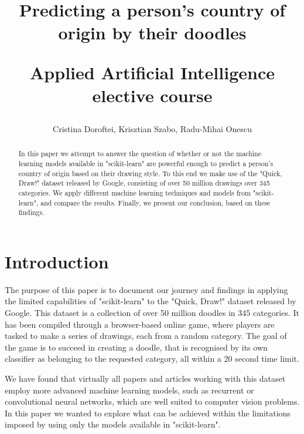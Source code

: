 \documentclass[a4paper, twocolumn]{article}
\author{Cristina Doroftei, Krisztian Szabo, Radu-Mihai Onescu}
\title{Predicting a person's country of origin by their doodles \\
    \begin{large}
        \bigskip
        Applied Artificial Intelligence elective course
    \end{large}
}
\begin{document}
\maketitle
\begin{abstract}
    In this paper we attempt to answer the question of whether or not the machine learning models available in "scikit-learn" are powerful enough to predict a person's country of origin based on their drawing style. To this end we make use of the "Quick, Draw!"\cite{quickdraw} dataset released by Google, consisting of over 50 million drawings over 345 categories. We apply different machine learning techniques and models from "scikit-learn"\cite{scikit-learn}, and compare the results. Finally, we present our conclusion, based on these findings.
\end{abstract}

\section{Introduction\label{sec:Introduction}}
The purpose of this paper is to document our journey and findings in applying the limited capabilities of "scikit-learn" to the "Quick, Draw!" dataset released by Google. This dataset is a collection of over 50 million doodles in 345 categories. It has been compiled through a browser-based online game, where players are tasked to make a series of drawings, each from a random category. The goal of the game is to succeed in creating a doodle, that is recognised by its own classifier as belonging to the requested category, all within a 20 second time limit.

We have found that virtually all papers and articles working with this dataset employ more advanced machine learning models, such as recurrent or convolutional neural networks, which are well suited to computer vision problems. In this paper we wanted to explore what can be achieved within the limitations imposed by using only the models available in "scikit-learn".
\end{document}

